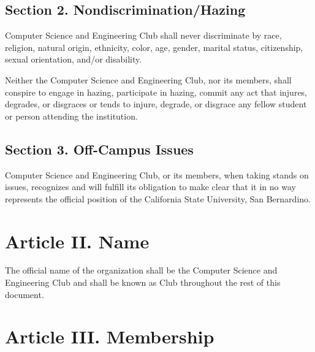 \documentclass{article}
\begin{document}
  \subsection{Section 2. Nondiscrimination/Hazing}
    Computer Science and Engineering Club shall never discriminate by race, religion, natural origin, ethnicity, color, age, gender, marital status, citizenship, sexual orientation, and/or disability.

    Neither the Computer Science and Engineering Club, nor its members, shall conspire to engage in hazing, participate in hazing, commit any act that injures, degrades, or disgraces or tends to injure, degrade, or disgrace any fellow student or person attending the institution.

  \subsection{Section 3. Off-Campus Issues}
    Computer Science and Engineering Club, or its members, when taking stands on issues, recognizes and will fulfill its obligation to make clear that it in no way represents the official position of the California State University, San Bernardino.

\section{Article II. Name}
  The official name of the organization shall be the Computer Science and Engineering Club and shall be known as Club throughout the rest of this document.

\section{Article III. Membership}
\end{document}
